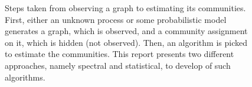 \documentclass[../../main.tex]{subfiles} %
\begin{document}
\begin{figure}[ht]
	\centering
	\caption{Steps taken from observing a graph to estimating its communities. 
	First, either an unknown process or some probabilistic model generates a 
	graph, which is observed, and a community assignment on it, which is 
	hidden (not observed). Then, an algorithm is picked to estimate the 
	communities. This report presents two different approaches, namely spectral 
	and statistical, to develop of such algorithms.}
	\label{fig:diagram-introduction}
\end{figure}
\end{document}
